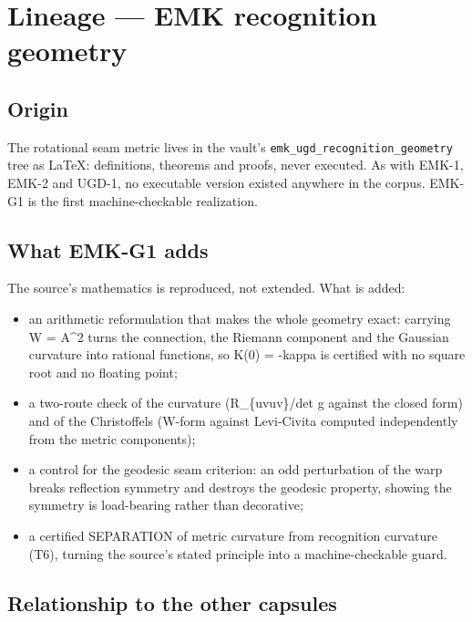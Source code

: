 \hypertarget{lineage-emk-recognition-geometry}{%
\chapter{Lineage --- EMK recognition geometry}\label{lineage-emk-recognition-geometry}}

\hypertarget{origin}{%
\section{Origin}\label{origin}}

The rotational seam metric lives in the vault's
\texttt{emk\_ugd\_recognition\_geometry} tree as LaTeX: definitions, theorems and
proofs, never executed. As with EMK-1, EMK-2 and UGD-1, no executable
version existed anywhere in the corpus. EMK-G1 is the first
machine-checkable realization.

\hypertarget{what-emk-g1-adds}{%
\section{What EMK-G1 adds}\label{what-emk-g1-adds}}

The source's mathematics is reproduced, not extended. What is added:

\begin{itemize}
\tightlist
\item
  an arithmetic reformulation that makes the whole geometry exact:
  carrying W = A\^{}2 turns the connection, the Riemann component and the
  Gaussian curvature into rational functions, so K(0) = -kappa is
  certified with no square root and no floating point;
\item
  a two-route check of the curvature (R\_\{uvuv\}/det g against the closed
  form) and of the Christoffels (W-form against Levi-Civita computed
  independently from the metric components);
\item
  a control for the geodesic seam criterion: an odd perturbation of the
  warp breaks reflection symmetry and destroys the geodesic property,
  showing the symmetry is load-bearing rather than decorative;
\item
  a certified SEPARATION of metric curvature from recognition curvature
  (T6), turning the source's stated principle into a machine-checkable
  guard.
\end{itemize}

\hypertarget{relationship-to-the-other-capsules}{%
\section{Relationship to the other capsules}\label{relationship-to-the-other-capsules}}

